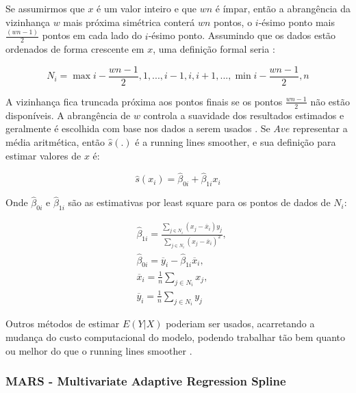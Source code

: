 \documentclass[
    12pt,               %
    openright,          %
    oneside,            %
    a4paper,            %
    english,            %
    brazil              %
    ]{abntex2}
\begin{document}
Se assumirmos que $x$ é um valor inteiro e que $wn$ é ímpar, então a abrangência da vizinhança $w$ mais próxima simétrica conterá
$wn$ pontos, o $i$-ésimo ponto mais $\frac{(wn - 1)}{2}$ pontos em cada lado do $i$-ésimo ponto. Assumindo que os dados
estão ordenados de forma crescente em $x$, uma definição formal seria \cite{GAM}:

\begin{equation}
    \label{eq:vizinhanca}
    N_i = {\max{i-\frac{wn-1}{2},1},...,i-1,i,i+1,...,\min{i-\frac{wn-1}{2},n}}
\end{equation}

A vizinhança fica truncada próxima aos pontos finais se os pontos $\frac{wn-1}{2}$ não estão disponíveis. A abrangência de $w$
controla a suavidade dos resultados estimados e geralmente é escolhida com base nos dados a serem usados \cite{GAM}. Se
$Ave$ representar a média aritmética, então $\hat{s}(.)$ é a running lines smoother, e sua definição para estimar valores
de $x$ é:

\begin{equation}
    \label{eq:running_lines_smoother}
    \hat{s}(x_i) = \hat{\beta}_{0i} + \hat{\beta}_{1i}x_i
\end{equation}

Onde $\hat{\beta}_{0i}$ e $\hat{\beta}_{1i}$ são as estimativas por least square para os pontos de dados de $N_i$:

\begin{equation}
    \label{eq:least_square_betas}
    \begin{split}
        &\hat{\beta}_{1i} = \frac{\sum_{j \in N_i}(x_j - \overline{x}_i)y_j}{\sum_{j \in N_i}(x_j - \overline{x}_i)^2}, \\
        &\hat{\beta}_{0i} = \overline{y}_i - \hat{\beta}_{1i}\overline{x}_i, \\
        &\overline{x}_i = \frac{1}{n}\sum_{j \in N_i}x_j, \\
        &\overline{y}_i = \frac{1}{n}\sum_{j \in N_i}y_j
    \end{split}
\end{equation}

Outros métodos de estimar $E(Y|X)$ poderiam ser usados, acarretando a mudança do custo computacional do modelo, podendo
trabalhar tão bem quanto ou melhor do que o running lines smoother \cite{GAM}.

\subsubsection{MARS - Multivariate Adaptive Regression Spline}
\end{document}
